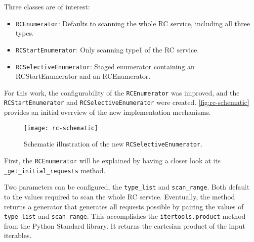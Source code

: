 Three classes are of interest:

\begin{itemize}
    \item \texttt{RCEnumerator}: Defaults to scanning the whole RC service, including all three types.
    \item \texttt{RCStartEnumerator}: Only scanning type1 of the RC service.
    \item \texttt{RCSelectiveEnumerator}: Staged enumerator containing an RCStartEnumerator and an RCEnumerator.
\end{itemize}

For this work, the configurability of the \texttt{RCEnumerator} was improved, and the \texttt{RCStartEnumerator} and \texttt{RCSelectiveEnumerator} were created. \autoref{fig:rc-schematic} provides an initial overview of the new implementation mechanisms.

\begin{figure}[htb]
    \centering
    \texttt{[image: rc-schematic]}
    \caption{Schematic illustration of the new \texttt{RCSelectiveEnumerator}.}
    \label{fig:rc-schematic}
\end{figure}

First, the \texttt{RCEnumerator} will be explained by having a closer look at its \texttt{_get_initial_requests} method.


Two parameters can be configured, the \texttt{type_list} and \texttt{scan_range}. Both default to the values required to scan the whole RC service. Eventually, the method returns a generator that generates all requests possible by pairing the values of \texttt{type_list} and \texttt{scan_range}. This accomplishes the \texttt{itertools.product} method from the Python Standard library. It returns the cartesian product of the input iterables.

